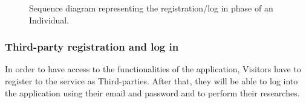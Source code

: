             \begin{figure}[H]
                \centering
                \caption{Sequence diagram representing the registration/log in phase of an Individual.}
                \label{fig:seq-diagram1}
            \end{figure}
        
        \subsubsection{Third-party registration and log in}
            In order to have access to the functionalities of the application, Visitors have to register to the service as Third-parties. After that, they will be able to log into the application using their email and password and to perform their researches.
            
